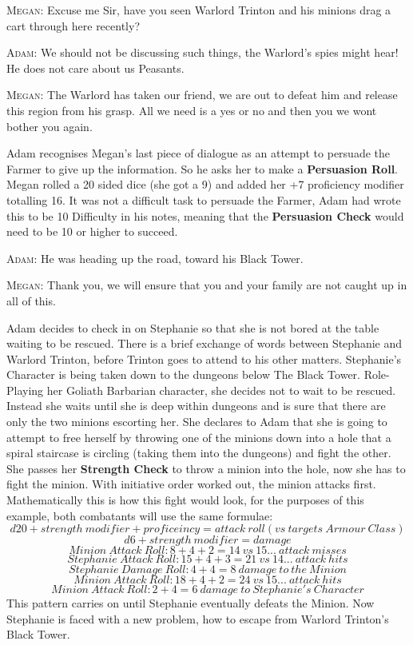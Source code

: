 \documentclass[review]{cmpreport}
\begin{document}
	\textsc{Megan}: Excuse me Sir, have you seen Warlord Trinton and his minions drag a cart through here recently?
	
	\textsc{Adam}: We should not be discussing such things, the Warlord's spies might hear! He does not care about us Peasants.
	
	\textsc{Megan}: The Warlord has taken our friend, we are out to defeat him and release this region from his grasp. All we need is a yes or no and then you we wont bother you again.
	
	Adam recognises Megan's last piece of dialogue as an attempt to persuade the Farmer to give up the information. So he asks her to make a \textbf{Persuasion Roll}. Megan rolled a 20 sided dice (she got a 9) and added her +7 proficiency modifier totalling 16. It was not a difficult task to persuade the Farmer, Adam had wrote this to be 10 Difficulty in his notes, meaning that the \textbf{Persuasion Check} would need to be 10 or higher to succeed.
	
	\textsc{Adam}: He was heading up the road, toward his Black Tower. 
	
	\textsc{Megan}: Thank you, we will ensure that you and your family are not caught up in all of this.
	
	Adam decides to check in on Stephanie so that she is not bored at the table waiting to be rescued. There is a brief exchange of words between Stephanie and Warlord Trinton, before Trinton goes to attend to his other matters. Stephanie's Character is being taken down to the dungeons below The Black Tower. Role-Playing her Goliath Barbarian character, she decides not to wait to be rescued. Instead she waits until she is deep within dungeons and is sure that there are only the two minions escorting her. She declares to Adam that she is going to attempt to free herself by throwing one of the minions down into a hole that a spiral staircase is circling (taking them into the dungeons) and fight the other. She passes her \textbf{Strength Check} to throw a minion into the hole, now she has to fight the minion. With initiative order worked out, the minion attacks first. Mathematically this is how this fight would look, for the purposes of this example, both combatants will use the same formulae:
	\[d20 + strength \ modifier + proficeincy = attack \ roll (vs \ targets \ Armour \ Class)\]
	\[d6 + strength \ modifier = damage\]
	\[Minion \ Attack \ Roll: 8 + 4 + 2 = 14 \ vs \ 15 ... \ attack \ misses\]
	\[Stephanie \ Attack \ Roll: 15 + 4 + 3 = 21 \ vs \ 14 ... \ attack \ hits\]
	\[Stephanie \ Damage \ Roll: 4 + 4 = 8 \ damage \ to \ the \ Minion\]
	\[Minion \ Attack \ Roll: 18 + 4 + 2 = 24 \ vs \ 15 ... \ attack \ hits\]
	\[Minion \ Attack \ Roll: 2 + 4 = 6 \ damage \ to \ Stephanie's \ Character\]
	This pattern carries on until Stephanie eventually defeats the Minion. Now Stephanie is faced with a new problem, how to escape from Warlord Trinton's Black Tower.
	
\end{document}
